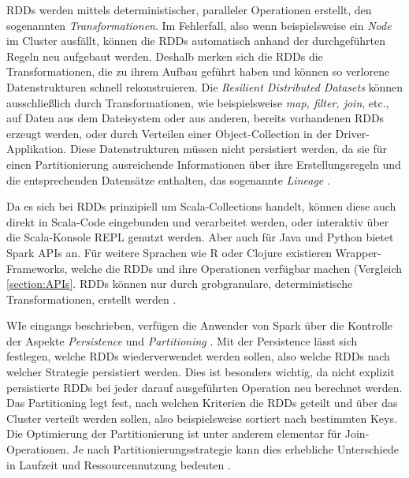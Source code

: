 RDDs werden mittels deterministischer, paralleler Operationen erstellt, den sogenannten \textit{Transformationen}. Im Fehlerfall, also wenn beispielsweise ein \textit{Node} im Cluster ausfällt, können die RDDs automatisch anhand der durchgeführten Regeln neu aufgebaut werden. Deshalb merken sich die RDDs die Transformationen, die zu ihrem Aufbau geführt haben und können so verlorene Datenstrukturen schnell rekonstruieren. Die \textit{Resilient Distributed Datasets} können ausschließlich durch Transformationen, wie beispielsweise \textit{map, filter, join}, etc., auf Daten aus dem Dateisystem oder aus anderen, bereits vorhandenen RDDs erzeugt werden, oder durch Verteilen einer Object-Collection in der Driver-Applikation. Diese Datenstrukturen müssen nicht persistiert werden, da sie für einen Partitionierung ausreichende Informationen über ihre Erstellungsregeln und die entsprechenden Datensätze enthalten, das sogenannte \textit{Lineage} .   

Da es sich bei RDDs prinzipiell um Scala-Collections handelt, können diese auch direkt in Scala-Code eingebunden und verarbeitet werden, oder interaktiv über die Scala-Konsole REPL genutzt werden. Aber auch für Java und Python bietet Spark APIs an. Für weitere Sprachen wie R oder Clojure existieren Wrapper-Frameworks, welche die RDDs und ihre Operationen verfügbar machen (Vergleich \ref{section:APIs}. RDDs können nur durch grobgranulare, deterministische Transformationen, erstellt werden . 

WIe eingangs beschrieben, verfügen die Anwender von Spark über die Kontrolle der Aspekte \textit{Persistence} und \textit{Partitioning} . Mit der Persistence lässt sich festlegen, welche RDDs wiederverwendet werden sollen, also welche RDDs nach welcher Strategie persistiert werden. Dies ist besonders wichtig, da nicht explizit persistierte RDDs bei jeder darauf ausgeführten Operation neu berechnet werden. Das Partitioning legt fest, nach welchen Kriterien die RDDs geteilt und über das Cluster verteilt werden sollen, also beispielsweise sortiert nach bestimmten Keys. Die Optimierung der Partitionierung ist unter anderem elementar für Join-Operationen. Je nach Partitionierungsstrategie kann dies erhebliche Unterschiede in Laufzeit und Ressourcennutzung bedeuten .  

